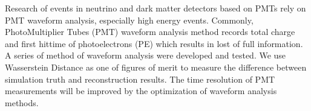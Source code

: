 Research of events in neutrino and dark matter detectors based on PMTs rely on PMT waveform analysis, especially high energy events. Commonly, PhotoMultiplier Tubes (PMT) waveform analysis method records total charge and first hittime of photoelectrons (PE) which results in lost of full information. A series of method of waveform analysis were developed and tested. We use Wasserstein Distance as one of figures of merit to measure the difference between simulation truth and reconstruction results. The time resolution of PMT measurements will be improved by the optimization of waveform analysis methods. 